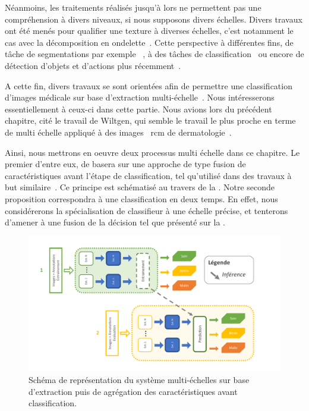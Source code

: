 Néanmoins, les traitements réalisés jusqu'à lors ne permettent pas une compréhension à divers niveaux, si nous supposons divers échelles. Divers travaux ont été menés pour qualifier une texture à diverses échelles, c'est notamment le cas avec la décomposition en ondelette~\cite{}. Cette perspective à différentes fins, de tâche de segmentations par exemple ~\cite{Santos2012}, à des tâches de classification~\cite{Alsaih2016} ou encore de détection d'objets et d'actions plus récemment~\cite{Pedersoli2011}.\par 

A cette fin, divers travaux se sont orientées afin de permettre une classification d'images médicale sur base d'extraction multi-échelle~\cite{Alsaih2016,Tzalavra2016}. Nous intéresserons essentiellement à ceux-ci dans cette partie. Nous avions lors du précédent chapitre, cité le travail de Wiltgen, qui semble le travail le plus proche en terme de multi échelle appliqué à des images ~\gls{rcm} de dermatologie~\cite{Wiltgen2008}.\par

Ainsi, nous mettrons en oeuvre deux processus multi échelle dans ce chapitre. Le premier d'entre eux, de basera sur une approche de type fusion de caractéristiques avant l'étape de classification, tel qu'utilisé dans des travaux à but similaire~\cite{Pedersoli2011,Alsaih2016}. Ce principe est schématisé au travers de la . Notre seconde proposition correspondra à une classification en deux temps. En effet, nous considérerons la spécialisation de classifieur à une échelle précise, et tenterons d'amener à une fusion de la décision tel que présenté sur la .\par

\begin{figure}[H]
    \centering
    \includegraphics[width=\linewidth]{contents/chapter_5/resources/scheme_multiscale_features.pdf}
    \caption{Schéma de représentation du système multi-échelles sur base d'extraction puis de agrégation des caractéristiques avant classification.}
    \label{fig:scheme_multiscale_features}
\end{figure}\par

